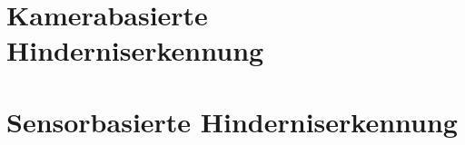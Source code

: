 \section{Kamerabasierte Hinderniserkennung}
\label{sec:kamera_basierte_he}

\section{Sensorbasierte Hinderniserkennung}
\label{sec:sensor_basierte_he}
